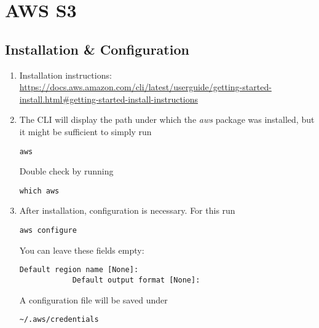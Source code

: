 \documentclass[12pt, a4paper]{article}
\numberwithin{equation}{section}
\theoremstyle{definition}
\theoremstyle{definition}
\begin{document}
	\section{AWS S3} 
	
	\subsection{Installation \& Configuration}
	
	\begin{enumerate}
		\item Installation instructions:~ \url{https://docs.aws.amazon.com/cli/latest/userguide/getting-started-install.html#getting-started-install-instructions}
		\item The CLI will display the path under which the \textit{aws} package was installed, but it might be sufficient to simply run 
		
		\begin{lstlisting}[style=mystylebash, label=alg:aws, xleftmargin=\parindent]
			aws
		\end{lstlisting}
		
		Double check by running 
		
		\begin{lstlisting}[style=mystylebash, label=alg:aws_path, xleftmargin=\parindent]
			which aws
		\end{lstlisting}
		
		\item After installation, configuration is necessary. For this run
		
		\begin{lstlisting}[style=mystylebash, label=alg:aws_configure, xleftmargin=\parindent]
			aws configure
		\end{lstlisting}
		
		You can leave these fields empty:
		
		\begin{lstlisting}[style=mystylebash, label=alg:aws_configure__default_reg, xleftmargin=\parindent]
			Default region name [None]:
			Default output format [None]:
		\end{lstlisting}
		
		A configuration file will be saved under 
		
		\begin{lstlisting}[style=mystylebash, label=alg:aws__config_file, xleftmargin=\parindent]
			~/.aws/credentials
		\end{lstlisting}
		

\end{enumerate}
\end{document}
